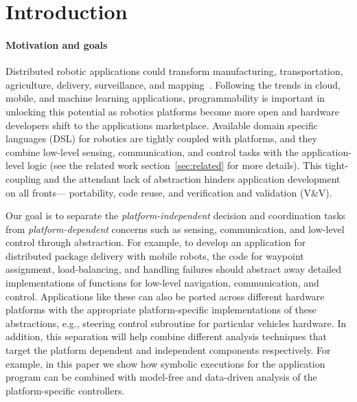 \section{Introduction}
\label{sec:intro}

\paragraph{Motivation and goals}
Distributed robotic applications could transform manufacturing, transportation, agriculture, delivery, surveillance, and mapping~\cite{}. Following the trends in cloud, mobile, and machine learning applications, programmability is important in unlocking this potential as robotics platforms become more open and hardware developers shift to the applications marketplace. Available domain specific languages (DSL) for robotics are tightly coupled with platforms, and they combine low-level sensing, communication, and control tasks with the application-level logic (see the related work section~\ref{sec:related} for  more details). This tight-coupling and the attendant lack of abstraction hinders application development on all fronts---  portability, code reuse, and verification and validation (V\&V).



Our goal is to separate the \emph{platform-independent} decision and coordination tasks from \emph{platform-dependent} concerns such as sensing, communication, and low-level control through abstraction. For example, to develop an application for distributed package delivery with mobile robots, the code for waypoint assignment, load-balancing, and handling failures should abstract away detailed implementations of functions for low-level navigation, communication, and control. Applications like these can also be ported across different hardware platforms with the appropriate platform-specific implementations of these abstractions, e.g., steering control subroutine for particular vehicles hardware.
%
In addition, this separation will help combine different analysis techniques that target the platform dependent and independent components respectively. For example, in this paper we show how symbolic executions for the application program can be combined with model-free and data-driven analysis of the platform-specific controllers.



